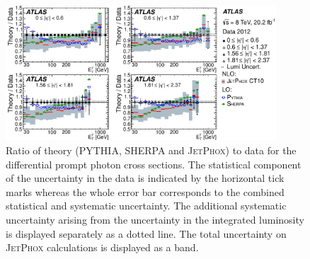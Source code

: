 \documentclass{PoS}
\providecommand{\JETPHOX} {{\textsc{JetPhox}}\xspace}
\begin{document}
\begin{figure}
\begin{center}
\includegraphics[width=0.9\textwidth]{Figure12.pdf} 
\caption{Ratio of theory (PYTHIA, SHERPA and \JETPHOX) to data for the differential prompt photon cross sections. The
  statistical component of the uncertainty in the data is indicated by the horizontal 
  tick marks whereas the whole error bar corresponds to the combined statistical and systematic uncertainty. The
  additional systematic uncertainty arising from the uncertainty in the integrated luminosity is displayed separately as
  a dotted line. The total uncertainty on \JETPHOX calculations is displayed as a band. }  
\label{fig:photon_MC}
\end{center}
\end{figure}
\end{document}
